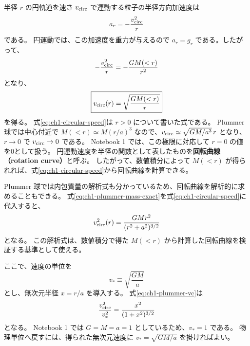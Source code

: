 半径 $r$ の円軌道を速さ $v_{\rm circ}$ で運動する粒子の半径方向加速度は
\begin{equation}
 a_r=-\frac{v_{\rm circ}^2}{r}
\end{equation}
である。
円運動では、この加速度を重力が与えるので $a_r=g_r$ である。したがって、
\begin{equation}
 -\frac{v_{\rm circ}^2}{r}
 =-\frac{GM(<r)}{r^2}
\end{equation}
となり、
\begin{equation}
 \boxed{
 v_{\rm circ}(r)
 =\sqrt{\frac{GM(<r)}{r}}
 }
\label{eq:ch1-circular-speed}
\end{equation}
を得る\cite{ryden2025}。
式\eqref{eq:ch1-circular-speed}は $r>0$ について書いた式である。
Plummer 球では中心付近で $M(<r)\simeq M(r/a)^3$ なので、$v_{\rm circ}\simeq \sqrt{GM/a^3}\,r$ となり、$r\rightarrow0$ で $v_{\rm circ}\rightarrow0$ である。
Notebook 1 では、この極限に対応して $r=0$ の値を0として扱う。
円運動速度を半径の関数として表したものを\textbf{回転曲線（rotation curve）}と呼ぶ。
したがって、数値積分によって $M(<r)$ が得られれば、式\eqref{eq:ch1-circular-speed}から回転曲線を計算できる。

Plummer 球では内包質量の解析式も分かっているため、回転曲線を解析的に求めることもできる。
式\eqref{eq:ch1-plummer-mass-exact}を式\eqref{eq:ch1-circular-speed}に代入すると、
\begin{equation}
 v_{\rm circ}^2(r)
 =\frac{GMr^2}{(r^2+a^2)^{3/2}}
\label{eq:ch1-plummer-vc}
\end{equation}
となる。
この解析式は、数値積分で得た $M(<r)$ から計算した回転曲線を検証する基準として使える。

ここで、速度の単位を
\begin{equation}
 v_\ast\equiv\sqrt{\frac{GM}{a}}
\label{eq:ch1-velocity-unit}
\end{equation}
とし、無次元半径 $x=r/a$ を導入する。
式\eqref{eq:ch1-plummer-vc}は
\begin{equation}
 \frac{v_{\rm circ}^2}{v_\ast^2}
 =\frac{x^2}{(1+x^2)^{3/2}}
\label{eq:ch1-plummer-vc2}
\end{equation}
となる。
Notebook 1 では $G=M=a=1$ としているため、$v_\ast=1$ である。
物理単位へ戻すには、得られた無次元速度に $v_\ast=\sqrt{GM/a}$ を掛ければよい。

